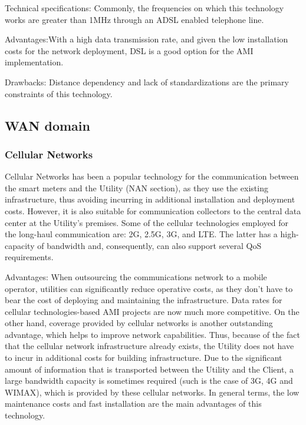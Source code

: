 \documentclass[11pt,draftclsnofoot,onecolumn]{IEEEtran}
\begin{document}
Technical specifications: Commonly, the frequencies on which this technology works are greater than 1MHz through an ADSL enabled telephone line. 

Advantages:With a high data transmission rate, and given the low installation costs for the network deployment, DSL is a good option for the AMI implementation.

Drawbacks: Distance dependency and lack of standardizations are the primary constraints of this technology.

\subsection{WAN domain}

\subsubsection{Cellular Networks}\label{tech::cellular}
Cellular Networks has been a popular technology for the communication between the smart meters and the Utility (NAN section), as they use the existing infrastructure, thus avoiding incurring in additional installation and deployment costs. However, it is also suitable for communication collectors to the central data center at the Utility's premises. Some of the cellular technologies employed for the long-haul communication are: 2G, 2.5G, 3G, and LTE. The latter has a high-capacity of bandwidth and, consequently, can also support several QoS requirements.

Advantages: When outsourcing the communications network to a mobile operator, utilities can significantly reduce operative costs, as they don’t have to bear the cost of deploying and maintaining the infrastructure. Data rates for cellular technologies-based AMI projects are now much more competitive. On the other hand, coverage provided by cellular networks is another outstanding advantage, which helps to improve network capabilities. Thus, because of the fact that the cellular network infrastructure already exists, the Utility does not have to incur in additional costs for building infrastructure. Due to the significant amount of information that is transported between the Utility and the Client, a large bandwidth capacity is sometimes required (such is the case of 3G, 4G and WIMAX), which is provided by these cellular networks. In general terms, the low maintenance costs and fast installation are the main advantages of this technology. 
\end{document}
